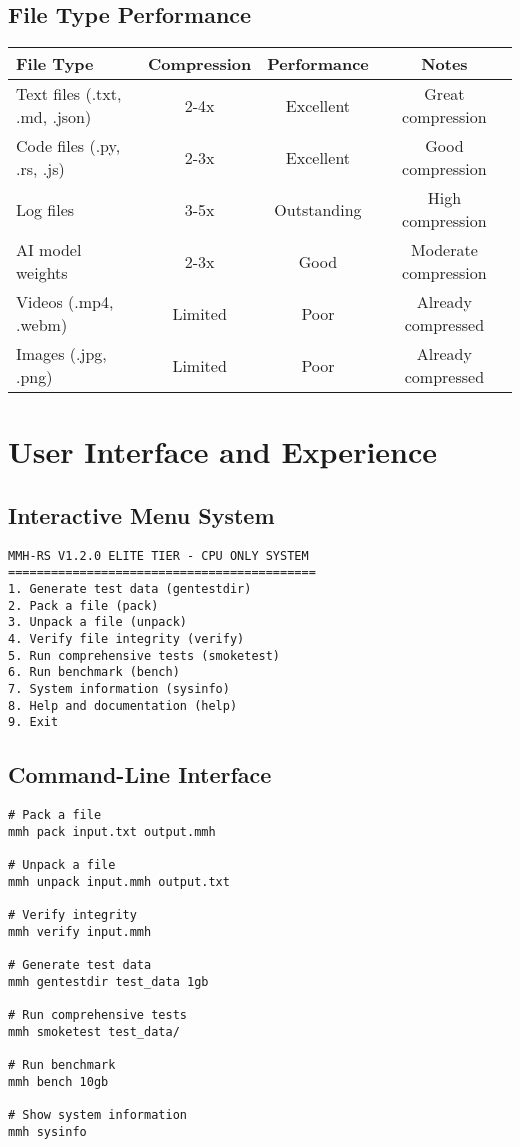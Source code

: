 \documentclass[12pt,a4paper]{article}
\begin{document}
\subsection{File Type Performance}
\begin{center}
\begin{tabular}{|l|c|c|c|}
\hline
\textbf{File Type} & \textbf{Compression} & \textbf{Performance} & \textbf{Notes} \\
\hline
Text files (.txt, .md, .json) & 2-4x & Excellent & Great compression \\
Code files (.py, .rs, .js) & 2-3x & Excellent & Good compression \\
Log files & 3-5x & Outstanding & High compression \\
AI model weights & 2-3x & Good & Moderate compression \\
Videos (.mp4, .webm) & Limited & Poor & Already compressed \\
Images (.jpg, .png) & Limited & Poor & Already compressed \\
\hline
\end{tabular}
\end{center}

\newpage

\section{User Interface and Experience}

\subsection{Interactive Menu System}
\begin{lstlisting}[caption=Main Menu Options]
MMH-RS V1.2.0 ELITE TIER - CPU ONLY SYSTEM
===========================================
1. Generate test data (gentestdir)
2. Pack a file (pack)
3. Unpack a file (unpack)
4. Verify file integrity (verify)
5. Run comprehensive tests (smoketest)
6. Run benchmark (bench)
7. System information (sysinfo)
8. Help and documentation (help)
9. Exit
\end{lstlisting}

\subsection{Command-Line Interface}
\begin{lstlisting}[caption=Basic Commands]
# Pack a file
mmh pack input.txt output.mmh

# Unpack a file
mmh unpack input.mmh output.txt

# Verify integrity
mmh verify input.mmh

# Generate test data
mmh gentestdir test_data 1gb

# Run comprehensive tests
mmh smoketest test_data/

# Run benchmark
mmh bench 10gb

# Show system information
mmh sysinfo
\end{lstlisting}
\end{document}

